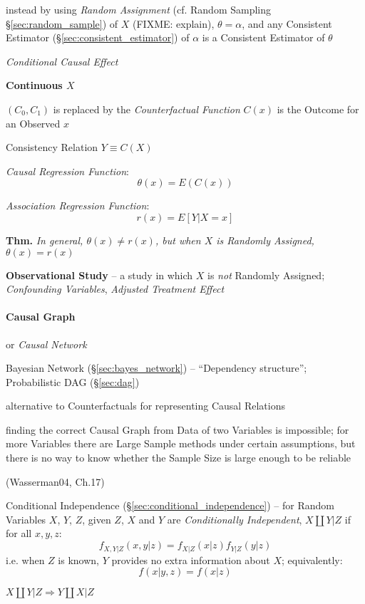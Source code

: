 instead by using \emph{Random Assignment} (cf. Random Sampling
\S\ref{sec:random_sample}) of $X$ (FIXME: explain), $\theta = \alpha$, and any
Consistent Estimator (\S\ref{sec:consistent_estimator}) of $\alpha$ is a
Consistent Estimator of $\theta$

\emph{Conditional Causal Effect}

\textbf{Continuous $X$}

$(C_0, C_1)$ is replaced by the \emph{Counterfactual Function} $C(x)$ is the
Outcome for an Observed $x$

Consistency Relation $Y \equiv C(X)$

\emph{Causal Regression Function}:
\[
  \theta(x) = E(C(x))
\]

\emph{Association Regression Function}:
\[
  r(x) = E[Y | X = x]
\]

\textbf{Thm.} \emph{In general, $\theta(x) \neq r(x)$, but when $X$ is Randomly
  Assigned, $\theta(x) = r(x)$}


\textbf{Observational Study} -- a study in which $X$ is \emph{not} Randomly
Assigned; \emph{Confounding Variables}, \emph{Adjusted Treatment Effect}



\paragraph{Causal Graph}\label{sec:causal_graph}\hfill

or \emph{Causal Network}

\fist Bayesian Network (\S\ref{sec:bayes_network}) -- ``Dependency structure'';
Probabilistic DAG (\S\ref{sec:dag})

alternative to Counterfactuals for representing Causal Relations

finding the correct Causal Graph from Data of two Variables is impossible; for
more Variables there are Large Sample methods under certain assumptions, but
there is no way to know whether the Sample Size is large enough to be reliable

(Wasserman04, Ch.17)

Conditional Independence (\S\ref{sec:conditional_independence}) -- for Random
Variables $X$, $Y$, $Z$, given $Z$, $X$ and $Y$ are \emph{Conditionally
  Independent}, $X \coprod Y | Z$ if for all $x,y,z$:
\[
  f_{X,Y|Z}(x,y|z) = f_{X|Z}(x|z) f_{Y|Z}(y|z)
\]
i.e. when $Z$ is known, $Y$ provides no extra information about $X$;
equivalently:
\[
  f(x|y, z) = f(x|z)
\]

$X \coprod Y | Z \Rightarrow Y \coprod X | Z$

